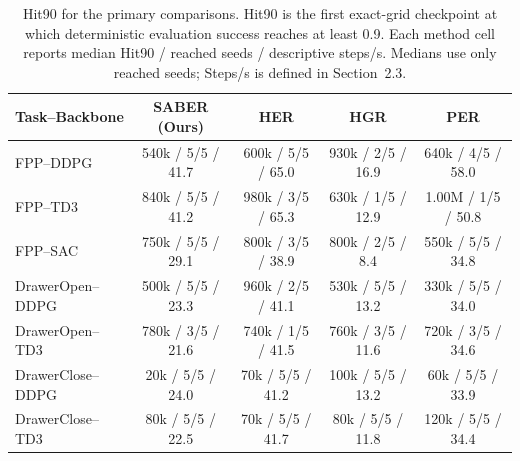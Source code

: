 \begin{table}[!b]
\centering
\small
\setlength{\tabcolsep}{4pt}
\begin{tabular*}{\textwidth}{@{\extracolsep{\fill}}lcccc@{}}
\toprule
Task--Backbone & SABER (Ours) & HER & HGR & PER \\
\midrule
FPP--DDPG & 540k / 5/5 / 41.7 & 600k / 5/5 / 65.0 & 930k / 2/5 / 16.9 & 640k / 4/5 / 58.0 \\
FPP--TD3 & 840k / 5/5 / 41.2 & 980k / 3/5 / 65.3 & 630k / 1/5 / 12.9 & 1.00M / 1/5 / 50.8 \\
FPP--SAC & 750k / 5/5 / 29.1 & 800k / 3/5 / 38.9 & 800k / 2/5 / 8.4 & 550k / 5/5 / 34.8 \\
\addlinespace[1pt]
DrawerOpen--DDPG & 500k / 5/5 / 23.3 & 960k / 2/5 / 41.1 & 530k / 5/5 / 13.2 & 330k / 5/5 / 34.0 \\
DrawerOpen--TD3 & 780k / 3/5 / 21.6 & 740k / 1/5 / 41.5 & 760k / 3/5 / 11.6 & 720k / 3/5 / 34.6 \\
DrawerClose--DDPG & 20k / 5/5 / 24.0 & 70k / 5/5 / 41.2 & 100k / 5/5 / 13.2 & 60k / 5/5 / 33.9 \\
DrawerClose--TD3 & 80k / 5/5 / 22.5 & 70k / 5/5 / 41.7 & 80k / 5/5 / 11.8 & 120k / 5/5 / 34.4 \\
\bottomrule
\end{tabular*}
\caption{Hit90 for the primary comparisons. Hit90 is the first exact-grid
checkpoint at which deterministic evaluation success reaches at least 0.9.
Each method cell reports median Hit90 / reached seeds / descriptive steps/s.
Medians use only reached seeds; Steps/s is defined in Section~2.3.}
\label{tab:supp-primary-hit90}
\end{table}
